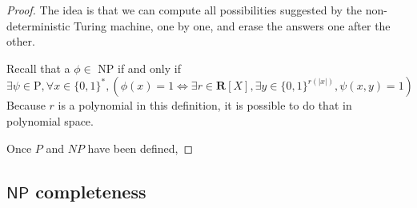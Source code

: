 \begin{proof}
    The idea is that we can compute all possibilities suggested by the non-deterministic Turing machine, one by one, and erase the answers one after the other.

    Recall that a $ \phi \in $ NP if and only if
    \[
        \exists \psi \in \mathrm P, \forall x \in \{ 0,1 \}^*, ( \phi(x) = 1 \iff \exists r \in \mathbf R[X], \exists y \in \{ 0,1 \}^{r(|x|)}, \psi(x,y) = 1)
    \]
    Because $ r $ is a polynomial in this definition, it is possible to do that in polynomial space.


Once $P$ and $NP$ have been defined,
\end{proof}

\subsection{$ \mathsf{NP} $ completeness}

\begin{theorem}
    
\end{theorem}

\begin{definition}

\end{definition}

